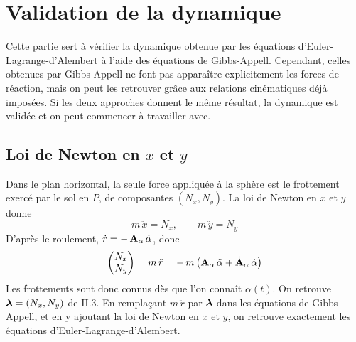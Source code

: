
\section{Validation de la dynamique}

Cette partie sert à vérifier la dynamique obtenue par les équations
d'Euler-Lagrange-d'Alembert à l'aide des équations de Gibbs-Appell.
Cependant, celles obtenues par Gibbs-Appell ne font pas apparaître explicitement les forces de réaction, mais on peut les retrouver grâce aux relations cinématiques déjà
imposées. Si les deux approches donnent le même résultat, la dynamique
est validée et on peut commencer à travailler avec.

\subsection{Loi de Newton en \texorpdfstring{$x$ et $y$}{x et y}}

Dans le plan horizontal, la seule force appliquée à la sphère est le
frottement exercé par le sol en $P$, de composantes $(N_x,N_y)$. La
loi de Newton en $x$ et $y$ donne
\[
    m\,\ddot x = N_x,
    \qquad
    m\,\ddot y = N_y
\]
D'après le roulement, $\dot r = -\,\mathbf{A}_\alpha\,\dot\alpha$, donc
\[
    \begin{pmatrix} N_x\\ N_y \end{pmatrix}
    = m\,\ddot r
    = -\,m\,\bigl(\mathbf{A}_\alpha\,\ddot\alpha
    + \dot{\mathbf{A}}_\alpha\,\dot\alpha\bigr)
\]
Les frottements sont donc connus dès que l'on connaît $\alpha(t)$. On retrouve
$\bm{\lambda} = (N_x,N_y)$ de II.3. En remplaçant $m\,\ddot r$ par
$\bm{\lambda}$ dans les équations de Gibbs-Appell, et en y ajoutant
la loi de Newton en $x$ et $y$, on retrouve exactement les équations
d'Euler-Lagrange-d'Alembert.

